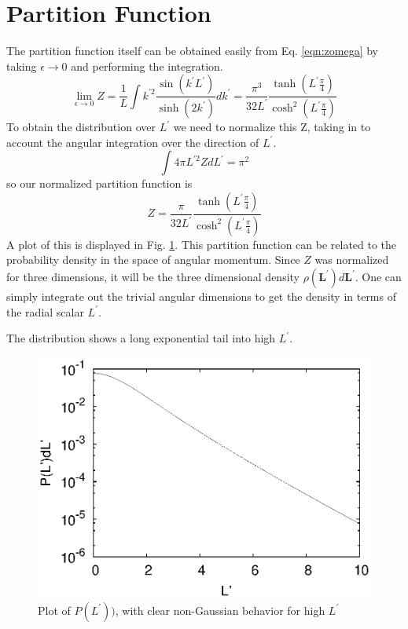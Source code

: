 \documentclass[pre,showpacs]{revtex4}
\begin{document}
\section{Partition Function}
The partition function itself can be obtained easily from Eq. \ref{eqn:zomega} by taking $\epsilon \to 0$ and performing the integration.
\begin{equation}
\lim_{\epsilon \to 0} Z = \frac{1}{L} \int k^{\prime2} \frac{\sin(k^\prime L^\prime)}{\sinh(2k^\prime)}dk^\prime = \frac{\pi^3}{32L^\prime}\frac{\tanh(L^\prime \frac{\pi}{4})}{\cosh^2(L^\prime \frac{\pi}{4})}
\end{equation}
To obtain the distribution over $L^\prime$ we need to normalize this Z, taking in to account the angular integration over the direction of $L^\prime$.
\begin{equation}
\int 4\pi L^{\prime2} Z dL^\prime = \pi^2
\end{equation}
so our normalized partition function is 
\begin{equation}
Z = \frac{\pi}{32L^\prime}\frac{\tanh(L^\prime \frac{\pi}{4})}{\cosh^2(L^\prime \frac{\pi}{4})}
\end{equation}
A plot of this is displayed in Fig. \ref{fig:P}.
This partition function can be related to the probability density in the space of angular momentum. Since $Z$ was normalized for three dimensions, it will be the three dimensional density $\rho(\mathbf{L^\prime})d\mathbf{L^\prime}$. One can simply integrate out the trivial angular dimensions to get the density in terms of the radial scalar $L^\prime$.

The distribution shows a long exponential tail into high $L^\prime$.
\begin{figure}
\begin{center}
\includegraphics[width=\hsize]{P}
\caption{Plot of $P(L^\prime))$, with clear non-Gaussian behavior for high $L^\prime$}
\label{fig:P}
\end{center}
\end{figure}
\end{document}
